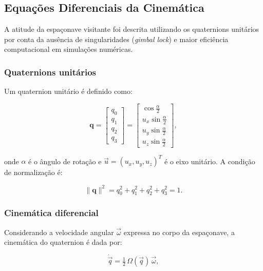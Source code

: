 \subsection{Equações Diferenciais da Cinemática}
\label{sec:equacoes_cinematica}

A atitude da espaçonave visitante foi descrita utilizando os quaternions unitários por conta da ausência de singularidades (\emph{gimbal lock}) e maior eficiência computacional em simulações numéricas.

\subsubsection{Quaternions unitários}

Um quaternion unitário é definido como:

\begin{equation}
\label{eq:quaternion_unitario_definicao}
\mathbf{q} =
\begin{bmatrix}
q_0 \\ q_1 \\ q_2 \\ q_3
\end{bmatrix}
=
\begin{bmatrix}
\cos\frac{\alpha}{2} \\
u_x \sin\frac{\alpha}{2} \\
u_y \sin\frac{\alpha}{2} \\
u_z \sin\frac{\alpha}{2}
\end{bmatrix},
\end{equation}

onde $\alpha$ é o ângulo de rotação e $\vec{u}=(u_x,u_y,u_z)^T$ é o eixo unitário.
A condição de normalização é:

\begin{equation}
\label{eq:normalizacao_quaternion}
\lVert \mathbf{q} \rVert^2 = q_0^2+q_1^2+q_2^2+q_3^2 = 1.
\end{equation}

\subsubsection{Cinemática diferencial}

Considerando a velocidade angular $\vec{\omega}$ expressa no corpo da espaçonave, a cinemática do quaternion é dada por:

\begin{equation}
\label{eq:qdot}
\dot{\vec{q}} = \tfrac{1}{2}\,\Omega(\vec{q})\,\vec{\omega},
\end{equation}

